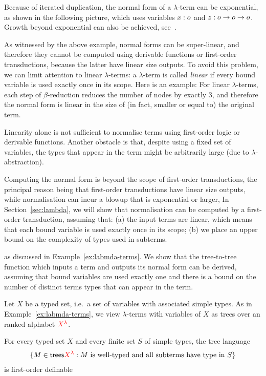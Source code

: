 \begin{example}\label{ex:exponential}
    Because of iterated duplication, the normal form of a $\lambda$-term can be exponential, as shown in the following picture, which uses variables $x : o$ and  $z : o \to o \to o$.
    Growth beyond exponential can also be achieved,  see~\cite[Section 3.6]{sorensen_lectures_2006}.
\end{example}
As witnessed by the above example, normal forms can be super-linear, and therefore they cannot be computed  using derivable functions or first-order transductions, because the latter have linear size outputs. To avoid this problem, we can limit attention to linear $\lambda$-terms: a $\lambda$-term is called \emph{linear} if every bound variable is used exactly once in its scope. Here is an example: 
For linear $\lambda$-terms, each step of $\beta$-reduction reduces the number of nodes by exactly 3, and therefore the normal form is linear in the size of (in fact, smaller or equal to) the original term. 

Linearity alone is not sufficient to normalise terms using first-order logic or derivable functions. Another obstacle is that, despite using a fixed set of variables, the types that appear in the term might be arbitrarily large (due to $\lambda$-abstraction). 

Computing the normal form is beyond the scope of first-order transductions, the principal reason being that first-order transductions have linear size outputs, while normalisation can incur a blowup that is exponential or larger,
 In Section~\ref{sec:lambda}, we will show that normalisation can be computed by a first-order transduction, assuming that: (a) the input terms are linear, which means that each bound variable is used exactly once in its scope; (b) we place an upper bound on the complexity of types used in subterms. 

as discussed in Example~\ref{ex:labmda-terms}.  We show that the tree-to-tree function which inputs a  term and outputs its normal form can be derived, assuming that bound variables are used exactly one and there is a bound on the number of distinct terms types that can appear in the term. 

Let $X$ be a typed set, i.e.~a set of variables with associated simple types. As in  Example~\ref{ex:labmda-terms},  we view $\lambda$-terms with variables of $X$ as trees over an ranked alphabet ${\color{red}{X^\lambda}}$. 

\begin{lemma}
    For every typed set $X$ and every finite set $S$ of simple types, the tree language 
    \begin{align*}
        \{ M \in \mathsf {trees} {\color{red}{X^\lambda}} : \text{$M$ is well-typed and all subterms have type in $S$}\}
    \end{align*}
    is first-order definable 
\end{lemma}



